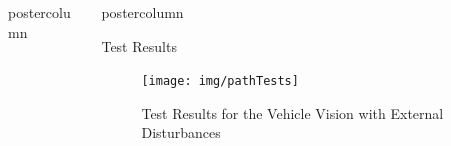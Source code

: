 \documentclass{beamer}
\newlength{\columnheight}
\begin{document}
\begin{frame}
\begin{columns}
\begin{column}{.5\textwidth}
\begin{beamercolorbox}[center]{postercolumn}
\begin{minipage}{.98\textwidth}
{		}\end{minipage}\end{beamercolorbox}
	\end{column}
	\begin{column}{.5\textwidth}
		\begin{beamercolorbox}[center]{postercolumn}
			\begin{minipage}{.98\textwidth} %
				\parbox[t][\columnheight]{\textwidth}{ %
					\begin{myblock}{Test Results}
			
				\begin{figure}
					\centering
					\texttt{[image: img/pathTests]}
					\caption{Test Results for the Vehicle Vision with External Disturbances}
					\label{fig:pathTests}
				\end{figure}
	

\end{myblock}}
\end{minipage}
\end{beamercolorbox}
\end{column}
\end{columns}
\end{frame}
\end{document}

